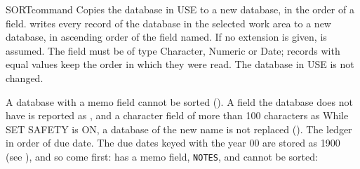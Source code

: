 \begin{XbaseEntry}{SORT}{command}
Copies the database in USE to a new database, in the order of a field.
\Syntax
{}
\Usage
{} writes every record of the database in the selected work area to
a new database, in ascending order of the field named.  If no extension is
given,  is assumed.  The field must be of type Character, Numeric
or Date; records with equal values keep the order in which they were read.
The database in USE is not changed.

A database with a memo field cannot be sorted ().  A field the database does not have is reported as
, and a character field of more than 100
characters as   While SET
SAFETY is ON, a database of the new name is not replaced
().
\Examples
The ledger in order of due date.  The due dates keyed with the year 00 are
stored as 1900 (see ), and so come first:
 has a memo field, \texttt{NOTES}, and cannot be sorted:
\end{XbaseEntry}

